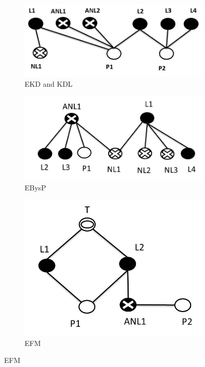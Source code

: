 \documentclass[journal]{IEEEtran}
\begin{document}
\begin{figure}
\centering
\begin{subfigure}{.4\textwidth}
\centering
\includegraphics[width=\linewidth]{NL_BASE.jpg}%
\caption{EKD and KDL}\label{fig:NL_Heuristics}%
\end{subfigure}%
\begin{subfigure}{.35\textwidth}
  \centering
\includegraphics[width=\linewidth]{PROMISENL.jpg}%
  \caption{EBysP}
  \label{fig:PROMISENL}
\end{subfigure}%
\begin{subfigure}{.25\textwidth}
  \centering
\includegraphics[width=\linewidth]{fm.jpg}
  \caption{EFM}
  \label{fig:efm}
\end{subfigure}%


\end{figure}
\end{document}
